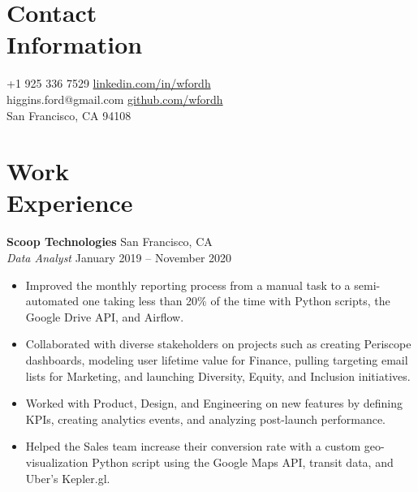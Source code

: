 \documentclass[line, margin]{res}
\begin{document}

\begin{resume}
	
	
\section{Contact \\ Information}
	+1 925 336 7529       \hfill \href{https://linkedin.com/in/wfordh/}{linkedin.com/in/wfordh} \\
	\noindent higgins.ford@gmail.com  \hfill \href{https://github.com/wfordh}{github.com/wfordh} \\
	\noindent San Francisco, CA 94108
	

\section{Work\\Experience}
	\textbf{Scoop Technologies} \hfill{San Francisco, CA} \vspace{1 mm}\\\vspace{0.5mm}%
	\textsl{Data Analyst} \hfill{January 2019 -- November 2020}\
	\begin{itemize}
		\item Improved the monthly reporting process from a manual task to a semi-automated one taking less than 20\% of the time with Python scripts, the Google Drive API, and Airflow.
		\item Collaborated with diverse stakeholders on projects such as creating Periscope dashboards, modeling user lifetime value for Finance, pulling targeting email lists for Marketing, and launching Diversity, Equity, and Inclusion initiatives.
		\item Worked with Product, Design, and Engineering on new features by defining KPIs, creating analytics events, and analyzing post-launch performance.
		\item Helped the Sales team increase their conversion rate with a custom geo-visualization Python script using the Google Maps API, transit data, and Uber's Kepler.gl.
	\end{itemize}\
	

\end{resume}
\end{document}
